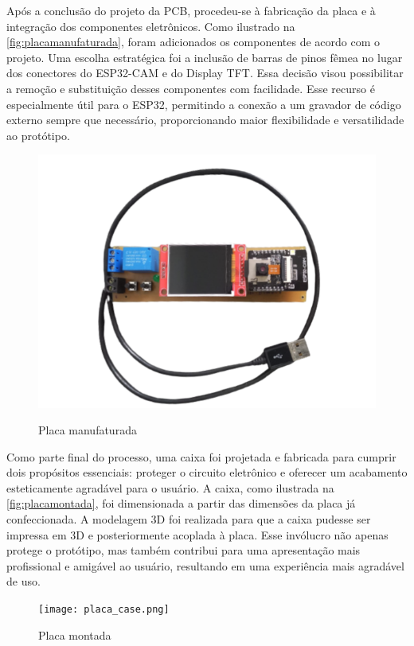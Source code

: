 Após a conclusão do projeto da PCB, procedeu-se à fabricação da placa e 
à integração dos componentes eletrônicos. Como ilustrado na \autoref{fig:placamanufaturada}, 
foram adicionados os componentes de acordo com o projeto. Uma escolha 
estratégica foi a inclusão de barras de pinos fêmea no lugar dos 
conectores do ESP32-CAM e do Display TFT. Essa decisão visou 
possibilitar a remoção e substituição desses componentes com 
facilidade. Esse recurso é especialmente útil para o ESP32, 
permitindo a conexão a um gravador de código externo sempre 
que necessário, proporcionando maior flexibilidade e 
versatilidade ao protótipo.

\begin{figure}[h!]
    \centering
    \caption{Placa manufaturada}
    \includegraphics[scale=0.35]{figuras/placa_montada.png}
    \fonte{}%
    \label{fig:placamanufaturada}
    \centering
\end{figure}

Como parte final do processo, uma caixa foi projetada e fabricada para cumprir 
dois propósitos essenciais: proteger o circuito eletrônico e oferecer um 
acabamento esteticamente agradável para o usuário. A caixa, como ilustrada 
na \autoref{fig:placamontada}, foi dimensionada a partir das dimensões da placa 
já confeccionada. A modelagem 3D foi realizada para que a caixa pudesse 
ser impressa em 3D e posteriormente acoplada à placa. Esse invólucro 
não apenas protege o protótipo, mas também contribui para uma 
apresentação mais profissional e amigável ao usuário, resultando em 
uma experiência mais agradável de uso.

\begin{figure}[h!]
    \centering
    \caption{Placa montada}
    \texttt{[image: placa\_case.png]}
    \fonte{}%
    \label{fig:placamontada}
    \centering
\end{figure}